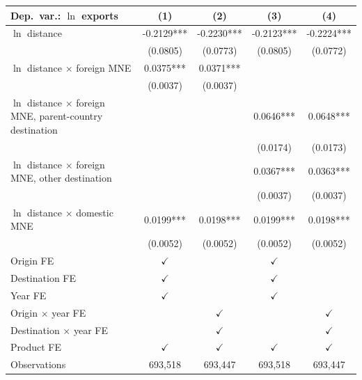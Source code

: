\begin{tabular}{lcccc} \hline
Dep.\ var.: $\ln$ exports & (1) & (2) & (3) & (4) \\ \hline
$\ln$ distance & -0.2129*** & -0.2230*** & -0.2123*** & -0.2224*** \\
 & (0.0805) & (0.0773) & (0.0805) & (0.0772) \\
$\ln$ distance $\times$ foreign MNE & 0.0375*** & 0.0371*** &  &  \\
 & (0.0037) & (0.0037) &  &  \\
$\ln$ distance $\times$ foreign MNE, parent-country destination &  &  & 0.0646*** & 0.0648*** \\
 &  &  & (0.0174) & (0.0173) \\
$\ln$ distance $\times$ foreign MNE, other destination &  &  & 0.0367*** & 0.0363*** \\
 &  &  & (0.0037) & (0.0037) \\
$\ln$ distance $\times$ domestic MNE & 0.0199*** & 0.0198*** & 0.0199*** & 0.0198*** \\
 & (0.0052) & (0.0052) & (0.0052) & (0.0052) \\
\hline
Origin FE & $\checkmark$ &  & $\checkmark$ &  \\
Destination FE & $\checkmark$ &  & $\checkmark$ &  \\
Year FE & $\checkmark$ &  & $\checkmark$ &  \\
Origin $\times$ year FE &  & $\checkmark$ &  & $\checkmark$ \\
Destination $\times$ year FE &  & $\checkmark$ &  & $\checkmark$ \\
Product FE & $\checkmark$ & $\checkmark$ & $\checkmark$ & $\checkmark$ \\
\hline
Observations & 693,518 & 693,447 & 693,518 & 693,447 \\
\hline
\end{tabular}
